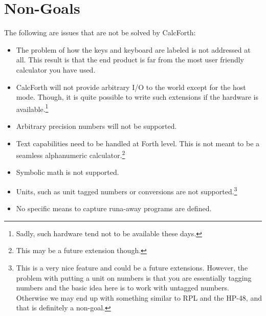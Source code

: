 \documentclass[a4paper]{article}
\begin{document}
\section{Non-Goals}
The following are issues that are not be solved by CalcForth:
\begin{itemize}
\item The problem of how the keys and keyboard are labeled is not addressed at all. This result is that the end product is far from the most user friendly calculator you have used.
\item CalcForth will not provide arbitrary I/O to the world except for the host mode. Though, it is quite possible to write such extensions if the hardware is available.\footnote{Sadly, such hardware tend not to be available these days.}
\item Arbitrary precision numbers will not be supported.
\item Text capabilities need to be handled at Forth level. This is not meant to be a seamless alphanumeric calculator.\footnote{This may be a future extension though.}
\item Symbolic math is not supported.
\item Units, such as unit tagged numbers or conversions are not supported.\footnote{This is a very nice feature and could be a future extensions. However, the problem with putting a unit on numbers is that you are essentially tagging numbers and the basic idea here is to work with untagged numbers. Otherwise we may end up with something similar to RPL and the HP-48, and that is definitely a non-goal.}
\item No specific means to capture runa-away programs are defined.
\end{itemize}
\end{document}
